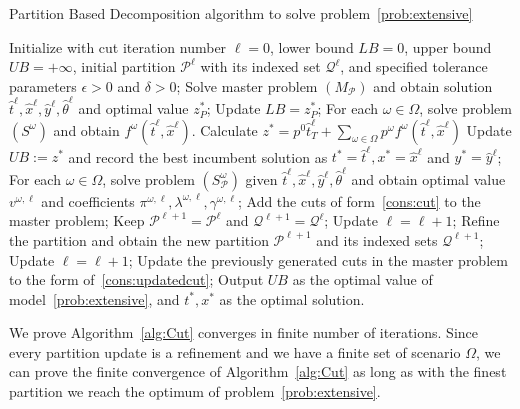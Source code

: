 \documentclass[11pt]{article}
\newcommand{\noi}{\noindent}
\begin{document}
	\begin{algorithm}
		\caption{Partition Based Decomposition algorithm to solve problem~\eqref{prob:extensive}}
		\label{alg:Cut}
		\begin{algorithmic}[1]
			\State Initialize with cut iteration number \(\ell = 0\), lower bound \(LB = 0\), upper bound \(UB = +\infty\), initial partition \(\mathcal{P}^\ell\) with its indexed set \(\mathcal{Q}^\ell\), and specified tolerance parameters \(\epsilon > 0\) and \(\delta > 0\);
			\State Solve master problem \((M_{\mathcal{P}})\) and obtain solution \(\hat{t}^{\ell}, \hat{x}^{\ell}, \hat{y}^{\ell}, \hat{\theta}^{\ell}\) and optimal value \(z_{P}^*\);
			\State Update \(LB = z_{P}^*\);
			\EndIf
			\State For each \(\omega \in \Omega\), solve problem \((S^\omega)\) and obtain \(f^{\omega}(\hat{t}^{\ell},\hat{x}^{\ell})\). 
			\State Calculate \(z^* = p^0 \hat{t}^\ell_T + \sum_{\omega \in \Omega} p^\omega f^{\omega}(\hat{t}^\ell,\hat{x}^\ell)\)
			\State Update \(UB := z^*\) and record the best incumbent solution as \(t^* = \hat{t}^\ell, x^* = \hat{x}^\ell\) and \(y^* = \hat{y}^\ell\);
			\EndIf
			\State For each \(\omega \in \Omega\), solve problem \((S_{\mathcal{P}}^\omega)\) given \(\hat{t}^{\ell}, \hat{x}^{\ell}, \hat{y}^{\ell}, \hat{\theta}^{\ell}\) and obtain optimal value \(v^{\omega,\ell}\) and coefficients \(\pi^{\omega,\ell}, \lambda^{\omega,\ell}, \gamma^{\omega,\ell}\);
			\State Add the cuts of form~\eqref{cons:cut} to the master problem;
			\State Keep \(\mathcal{P}^{\ell + 1} = \mathcal{P}^\ell\) and \(\mathcal{Q}^{\ell + 1} = \mathcal{Q}^\ell\); 
			\State Update \(\ell = \ell + 1\);
			\Else
			\State Refine the partition and obtain the new partition \(\mathcal{P}^{\ell + 1}\) and its indexed sets \(\mathcal{Q}^{\ell + 1}\);
			\State Update \(\ell = \ell + 1\);
			\State Update the previously generated cuts in the master problem to the form of~\eqref{cons:updatedcut};
			\EndIf
			\vspace{0.1cm}
			\State Output \(UB\) as the optimal value of model~\eqref{prob:extensive}, and \(t^*, x^*\) as the optimal solution.
		\end{algorithmic}
	\end{algorithm}
	\noi We prove Algorithm~\ref{alg:Cut} converges in finite number of iterations. Since every partition update is a refinement and we have a finite set of scenario \(\Omega\), we can prove the finite convergence of Algorithm~\ref{alg:Cut} as long as with the finest partition we reach the optimum of problem~\eqref{prob:extensive}.
\end{document}
